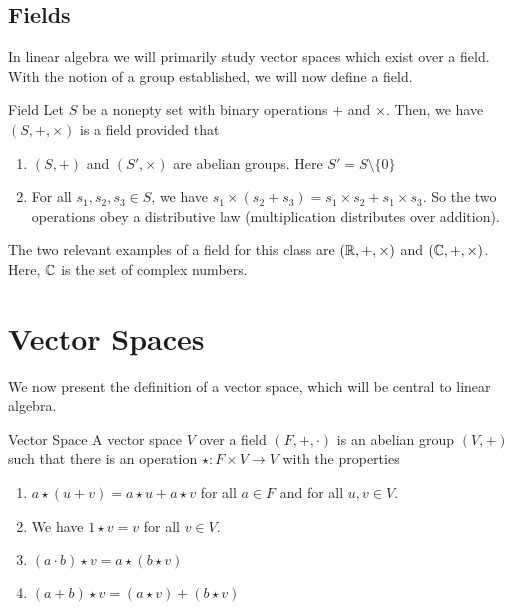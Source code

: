 \documentclass[main.tex]{subfiles}
\begin{document}
    
    \subsection{Fields}
    In linear algebra we will primarily study vector spaces which exist over a field. With the notion of a group established, we will now define a field. 
    \begin{defn}{Field}{}
        Let $S$ be a nonepty set with binary operations $+$ and $\times$. Then, we have $(S, +, \times)$ is a field provided that 
        \begin{enumerate}
            \item $(S, +)$ and $(S', \times)$ are abelian groups. Here $S' = S\setminus \{0\}$

            \item For all $s_1, s_2, s_3\in S$, we have $s_1 \times (s_2 + s_3) = s_1\times s_2 + s_1\times s_3$. So the two operations obey a distributive law (multiplication distributes over addition).
        \end{enumerate}
    \end{defn}

    \begin{example}{}{}
        The two relevant examples of a field for this class are $(\mathbb{R}, +, \times)$ and $(\mathbb{C}, +, \times)$. Here, $\mathbb{C}$ is the set of complex numbers.
    \end{example}

    \section{Vector Spaces}
    We now present the definition of a vector space, which will be central to linear algebra. 

    \begin{defn}{Vector Space}{}
        A vector space $V$ over a field $(F, +, \cdot)$ is an abelian group $(V, +)$ such that there is an operation $\star : F\times V \to V$ with the properties
        \begin{enumerate}
            \item $a\star (u + v) = a\star u + a \star v$ for all $a\in F$ and for all $u, v\in V$. 

            \item We have $1\star v = v$ for all $v\in V$.

            \item $(a\cdot b) \star v = a\star (b \star v)$

            \item $(a+b) \star v = (a\star v) + (b\star v)$
        \end{enumerate}
    \end{defn}
\end{document}
